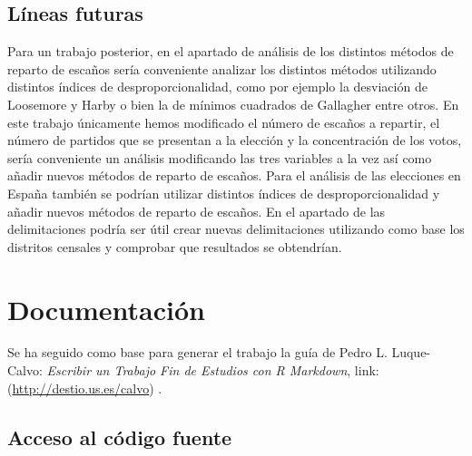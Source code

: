 \documentclass[12pt,a4paper,]{book}
\def\ifdoblecara{} %
\def\ifprincipal{} %
\numberwithin{dummy}{section}
\theoremstyle{ocrenumbox}
\theoremstyle{blacknumex}
\theoremstyle{blacknumbox}
\theoremstyle{ocrenum}
\theoremstyle{ocrenum}
\begin{document}
\hypertarget{luxedneas-futuras}{%
\section{Líneas futuras}\label{luxedneas-futuras}}

Para un trabajo posterior, en el apartado de análisis de los distintos
métodos de reparto de escaños sería conveniente analizar los distintos
métodos utilizando distintos índices de desproporcionalidad, como por
ejemplo la desviación de Loosemore y Harby o bien la de mínimos
cuadrados de Gallagher entre otros. En este trabajo únicamente hemos
modificado el número de escaños a repartir, el número de partidos que se
presentan a la elección y la concentración de los votos, sería
conveniente un análisis modificando las tres variables a la vez así como
añadir nuevos métodos de reparto de escaños. Para el análisis de las
elecciones en España también se podrían utilizar distintos índices de
desproporcionalidad y añadir nuevos métodos de reparto de escaños. En el
apartado de las delimitaciones podría ser útil crear nuevas
delimitaciones utilizando como base los distritos censales y comprobar
que resultados se obtendrían.

\FloatBarrier

\appendix

\ifdefined\ifprincipal
\else
\setlength{\parindent}{1em}
\pagestyle{fancy}
\setcounter{tocdepth}{4}
\tableofcontents

\fi

\ifdefined\ifdoblecara
\fancyhead{}{}
\fancyhead[LE,RO]{\scriptsize\rightmark}
\fancyfoot[LO,RE]{\scriptsize\slshape \leftmark}
\fancyfoot[C]{}
\fancyfoot[LE,RO]{\footnotesize\thepage}
\else
\fancyhead{}{}
\fancyhead[RO]{\scriptsize\rightmark}
\fancyfoot[LO]{\scriptsize\slshape \leftmark}
\fancyfoot[C]{}
\fancyfoot[RO]{\footnotesize\thepage}
\fi
\renewcommand{\headrulewidth}{0.4pt}
\renewcommand{\footrulewidth}{0.4pt}

\hypertarget{documentaciuxf3n}{%
\chapter{Documentación}\label{documentaciuxf3n}}

Se ha seguido como base para generar el trabajo la guía de Pedro L.
Luque-Calvo: \emph{Escribir un Trabajo Fin de Estudios con R Markdown},
link:(\url{http://destio.us.es/calvo}) .

\hypertarget{acceso-al-cuxf3digo-fuente}{%
\section{Acceso al código fuente}\label{acceso-al-cuxf3digo-fuente}}
\end{document}
